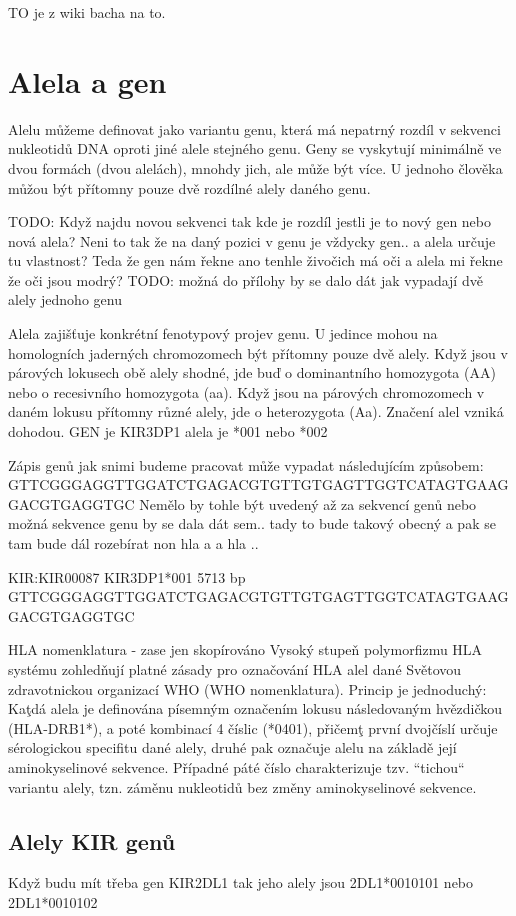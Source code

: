 \documentclass[czech,DP]{thesiskiv}
\begin{document}
TO je z wiki bacha na to.

\section{Alela a gen}
Alelu můžeme definovat jako variantu genu, která má nepatrný rozdíl v sekvenci nukleotidů DNA oproti jiné alele stejného genu. Geny se vyskytují minimálně ve dvou formách (dvou alelách), mnohdy jich, ale může být více. U jednoho člověka můžou být přítomny pouze dvě rozdílné alely daného genu. 

TODO: Když najdu novou sekvenci tak kde je rozdíl jestli je to nový gen nebo nová alela? Neni to tak že na daný pozici v genu je vždycky gen.. a alela určuje tu vlastnost?
Teda že gen nám řekne ano tenhle živočich má oči a alela mi řekne že oči jsou modrý?
TODO: možná do přílohy by se dalo dát jak vypadají dvě alely jednoho genu

Alela zajišťuje konkrétní fenotypový projev genu. U jedince mohou na homologních jaderných chromozomech být přítomny pouze dvě alely. Když jsou v párových lokusech obě alely shodné, jde buď o dominantního homozygota (AA) nebo o recesivního homozygota (aa). Když jsou na párových chromozomech v daném lokusu přítomny různé alely, jde o heterozygota (Aa). Značení alel vzniká dohodou.
GEN je KIR3DP1 alela je *001 nebo *002

Zápis genů jak snimi budeme pracovat může vypadat následujícím způsobem:
GTTCGGGAGGTTGGATCTGAGACGTGTTGTGAGTTGGTCATAGTGAAGGACGTGAGGTGC
 Nemělo by tohle být uvedený až za sekvencí genů nebo možná sekvence genu by se dala dát sem.. tady to bude takový obecný a pak se tam bude dál rozebírat non hla a a hla .. 

KIR:KIR00087 KIR3DP1*001 5713 bp
GTTCGGGAGGTTGGATCTGAGACGTGTTGTGAGTTGGTCATAGTGAAGGACGTGAGGTGC

HLA nomenklatura - zase jen skopírováno
Vysoký stupeň polymorfizmu HLA systému zohledňují platné zásady pro označování HLA
alel dané Světovou zdravotnickou organizací WHO (WHO nomenklatura). Princip je
jednoduchý: Kaţdá alela je definována písemným označením lokusu následovaným
hvězdičkou (HLA-DRB1*), a poté kombinací 4 číslic (*0401), přičemţ první dvojčíslí
určuje sérologickou specifitu dané alely, druhé pak označuje alelu na základě její
aminokyselinové sekvence. Případné páté číslo charakterizuje tzv. “tichou“ variantu alely,
tzn. záměnu nukleotidů bez změny aminokyselinové sekvence.

\subsection{Alely KIR genů}
Když budu mít třeba gen KIR2DL1
tak jeho alely jsou 2DL1*0010101 nebo 2DL1*0010102
\end{document}
